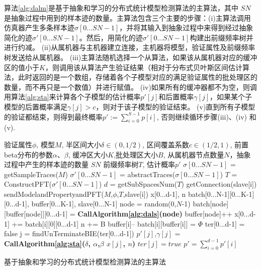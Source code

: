 算法\ref{alg:dalm}是基于抽象和学习的分布式统计模型检测算法的主算法，其中  $SN$是抽象过程中用到的样本迹的数量。主算法包含三个主要的步骤：(i)主算法调用仿真器产生多条样本迹$\sigma[0...SN-1]$，并将其输入到抽象过程中来得到经过抽象简化的迹$\sigma'[0...SN-1]$。然后，用简化的迹$\sigma'[0...SN-1]$构建出前缀频率树并进行约减。 (ii)从属机器与主机器建立连接，主机器将模型，验证属性及前缀频率树发送给从属机器。 (iii)主算法随机选择一个从算法，如果该从属机器对应的缓冲区的值小于$K$，则调用该从算法产生验证结果（相对于分布式贝叶斯区间估计算法，此时返回的是一个数组，存储着各个子模型对应的满足验证属性的批处理区的数量，而不再只是一个数值）并进行赋值。 (iv)如果所有的缓冲器都不为空，则调用算法\ref{alg:sta}来计算各个子模型的估计概率$p'[j]$和后置概率$\gamma[j]$，如果某个子模型的后置概率满足$\gamma[j] > c$，则对于该子模型的验证结束。 (v)直到所有子模型的验证都结束，则得到最终概率$p' := \sum\limits_{i=0}^{S-1} p[i]$, 否则继续循环步骤(iii)、(iv) 和 (v).
\begin{algorithm}[t]
\begin{algorithmic}[1]
\REQUIRE 验证属性$\phi$, 模型$M$, 半区间大小$\delta \in (0, 1/2)$, 区间覆盖系数$c \in (1/2, 1)$, 前置beta分布的参数$\alpha$、$\beta$, 缓冲区大小$K$,批处理区大小$B$, 从属机器节点数量$N$，抽象过程中产生的样本迹的数量 $SN$
\ENSURE 前缀频率树$T$, 估计概率$p'$
\STATE $\sigma[0...SN-1]$ = getSampleTraces($M$)
\STATE $\sigma'[0...SN-1]$ = abstractTraces($\sigma[0...SN-1]$)
\STATE $T$ = ConstructPFT($\sigma'[0...SN-1]$)
\STATE $d$ = getSubSpacesNum($T$)
\LOOP
\STATE getConnection(slave[i])
\STATE sendModelandPropertyandPFT($M$,$\phi$,$T$,slave[i])
\RETURN
\ENDIF
\ENDLOOP
\STATE x[0...d-1], n
\STATE batch[0...N-1][0...K-1][0...d-1], buffer[0...K-1], slave[0...N-1]
\LOOP
        \STATE node = random(0,$N$-1)
           \STATE batch[node][buffer[node]][0...d-1] = \textbf{CallAlgorithm\ref{alg:dals}(node)}
           \STATE buffer[node]++
        \ENDIF
        \LOOP
         \STATE x[0...d-1] += batch[i][0][0...d-1]
          \STATE n += B
           \STATE buffer[i]--
           \STATE batch[i][buffer[i]] = $\Phi$
         \RETURN
         \ENDIF    
         \ENDLOOP
         \ENDIF
          \STATE ter[0...d-1] = false
         \STATE  j = findUnTerminateBIE(ter[0...d-1])
          \STATE $p'[j]$,$\gamma[j]$ = \textbf{CallAlgorithm\ref{alg:sta}($\delta$, $\alpha$,$\beta$ $x[j]$, $n$)}
            \STATE $ter[j] = true$
         \ENDIF
         \RETURN
         \ENDIF
\ENDLOOP
\RETURN $p' = \sum\limits_{i=0}^{d-1} p'[i]$
\end{algorithmic}
\caption{基于抽象和学习的分布式统计模型检测算法的主算法}
\label{alg:dalm}
\end{algorithm}

